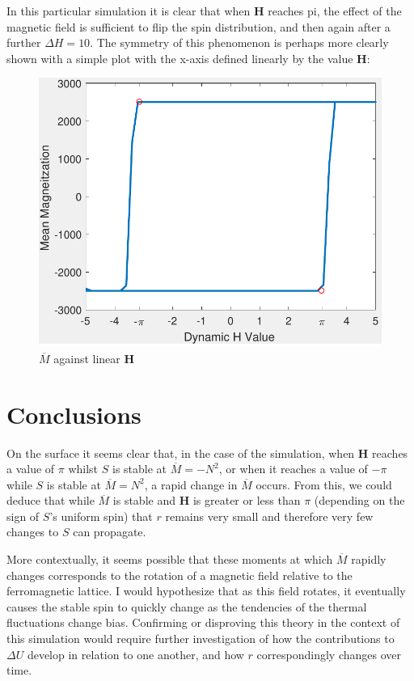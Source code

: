 \documentclass{article}
\begin{document}
\noindent In this particular simulation it is clear that when $\textbf{H}$ reaches pi, the effect of the magnetic field is sufficient to flip the spin distribution, and then again after a further $\Delta{H} =10.$ The symmetry of this phenomenon is perhaps more clearly shown with a simple plot with the x-axis defined linearly by the value $\textbf{H}$:
\begin{figure}[H]
\centering
    \includegraphics[width=\textwidth]{singleplot.pdf}
	\caption{$\overline{M}$ against linear $\textbf{H}$}
\end{figure}

\section{Conclusions}
On the surface it seems clear that, in the case of the simulation, when $\textbf{H}$ reaches a value of $\pi$ whilst $S$ is stable at $\overline{M} = -N^2$, or when it reaches a value of $-\pi$ while $S$ is stable at $\overline{M} = N^2$, a rapid change in $\overline{M}$ occurs. From this, we could deduce that while $\overline{M}$ is stable and $\textbf{H}$ is greater or less than $\pi$ (depending on the sign of $S$'s uniform spin) that $r$ remains very small and therefore very few changes to $S$ can propagate. 

More contextually, it seems possible that these moments at which $\overline{M}$ rapidly changes corresponds to the rotation of a magnetic field relative to the ferromagnetic lattice. I would hypothesize that as this field rotates, it eventually causes the stable spin to quickly change as the tendencies of the thermal fluctuations change bias. Confirming or disproving this theory in the context of this simulation would require further investigation of how the contributions to $\Delta U$ develop in relation to one another, and how $r$ correspondingly changes over time.


%
%
%
%
%
\end{document}
